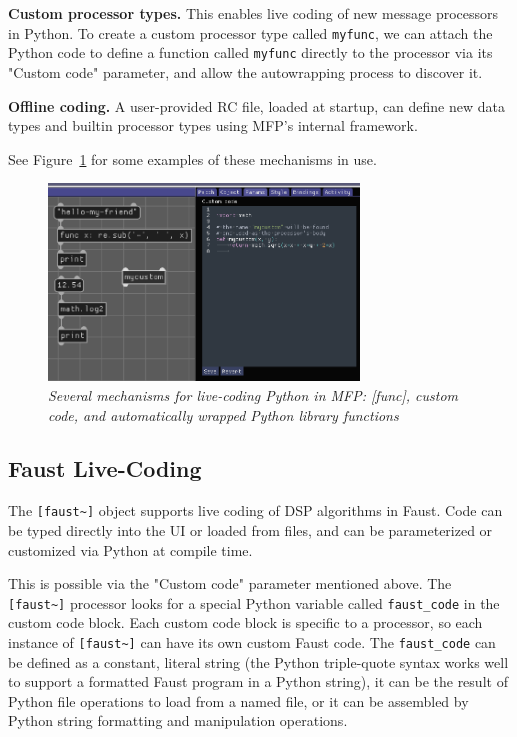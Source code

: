 \documentclass[a4paper]{article}
\def\:{\hskip0pt}
\begin{document}
{\bf Custom processor types.} This enables live coding of new
message processors in Python. To create a custom processor type
called {\tt myfunc}, we can attach the Python code to define a
function called {\tt myfunc} directly to the processor via its
"Custom code" parameter, and allow the autowrapping process to
discover it.

{\bf Offline coding.} A user\:-\:provided RC file, loaded at startup,
can define new data types and builtin processor types using MFP's
internal framework.

See Figure~\ref{fig:pythonlivecoding} for some examples of these
mechanisms in use.

\begin{figure}[ht]
\centerline{\includegraphics[width=3.25in]{python_livecoding.png}}
\caption{\label{fig:pythonlivecoding}{
    \it Several mechanisms for live-coding Python in MFP:
    [func], custom code, and automatically wrapped Python
    library functions
}}
\end{figure}

\subsection{Faust Live-Coding }

The {\tt [faust\textasciitilde]} object supports live coding of
DSP algorithms in Faust. Code can be typed directly into the UI
or loaded from files, and can be parameterized or customized via
Python at compile time.

This is possible via the "Custom code" parameter mentioned above.
The {\tt [faust\textasciitilde]} processor looks for a special
Python variable called {\tt faust\_code} in the custom code
block. Each custom code block is specific to a processor, so each
instance of {\tt [faust\textasciitilde]} can have its own custom
Faust code. The {\tt faust\_code} can be defined as a constant,
literal string (the Python triple\:-\:quote syntax works well to
support a formatted Faust program in a Python string), it can be
the result of Python file operations to load from a named file,
or it can be assembled by Python string formatting and
manipulation operations.
\end{document}
